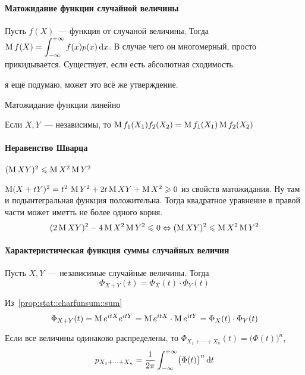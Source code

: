 \documentclass[12pt,timbord]{../../../notes}
\begin{document}
\paragraph{Матожидание функции случайной величины}
\label{par:stat::expfun}

\begin{defn}[$\ddot\sim$]\label{defn:stat::expfun::expfun}
  Пусть $f(X)$~--- функция от случаной величины. Тогда 
  $\displaystyle \operatorname{M} f(X) = \int_{-\infty}^{+\infty} f(x) p(x)\, \mathrm{d} x$. В случае чего он многомерный, просто
  прикидывается. Существует, если есть абсолютная сходимость.
\end{defn}
\begin{rem*}
  я ещё подумаю, может это всё же утверждение.
\end{rem*}
\begin{prop}\label{prop:stat::expfun::lin}
  Матожидание функции линейно
\end{prop}
\begin{prop}\label{prop:stat::expfun::mul}
  Если $X,Y$~--- независимы, то $\operatorname{M} f_1(X_1)f_2(X_2) = \operatorname{M} f_1(X_1) \operatorname{M} f_2(X_2)$
\end{prop}


\paragraph{Неравенство Шварца}
\label{par:stat::shwartz}

\begin{prop}\label{prop:stat::shwartz}
  $(\operatorname{M}  XY)^2 \leqslant \operatorname{M} X^2 \operatorname{M} Y^2$
\end{prop}
\begin{itlproof}
  $\operatorname{M} (X+ tY)^2 = t^2\,\operatorname{M} Y^2 + 2 t \operatorname{M} XY + \operatorname{M} X^2 \geqslant 0$ из свойств матожидания. Ну
  там и подынтегральная функция положительна. Тогда квадратное уравнение в правой части может
  иметть не более одного корня.
  \[
    (2 \operatorname{M} XY)^2 - 4 \operatorname{M} X^2 \operatorname{M} Y^2 \leqslant 0 \Leftrightarrow 
    (\operatorname{M}  XY)^2 \leqslant \operatorname{M} X^2 \operatorname{M} Y^2
  \]
\end{itlproof}

\paragraph{Характеристическая функция суммы случайных величин}
\label{par:stat::charfunsum}

\begin{prop}\label{prop:stat::charfunsum::sum}
  Пусть $X,Y$~--- независимые случайные величины. Тогда 
  \[
    \Phi_{X+Y}(t) = \Phi_X(t) \cdot \Phi_Y(t)
  \]
\end{prop}
\begin{itlproof}
  Из~\ref{prop:stat::charfunsum::sum}  
  \[
    \Phi_{X+Y}(t) = \operatorname{M} e^{itX} e^{itY} = \operatorname{M} e^{itX} \cdot \operatorname{M} e^{itY} = \Phi_{X}(t) \cdot
    \Phi_Y (t)
  \]
\end{itlproof}
\begin{cor}\label{conj:stat::charfunsum::sumn}
  Если все величины одинаково распределены, то $\Phi_{X_1 + \dotsb + X_n}(t) =
  \bigl(\Phi(t)\bigr)^n$, \[
    p_{X_1 + \dotsb + X_n} = \frac{1}{2\pi} \int_{-\infty}^{+\infty} \bigl(\Phi(t)\bigr)^n \, \mathrm{d} t 
  \]
\end{cor}
\end{document}

